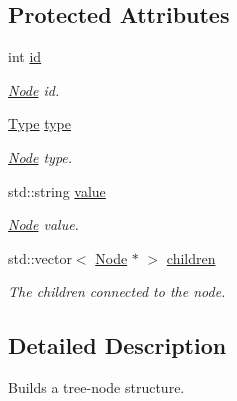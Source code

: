 \subsection*{Protected Attributes}
\begin{DoxyCompactItemize}
\item 
\hypertarget{classNode_a59a543130a10c95f1e8642cf8c5645e8}{}int \hyperlink{classNode_a59a543130a10c95f1e8642cf8c5645e8}{id}\label{classNode_a59a543130a10c95f1e8642cf8c5645e8}

\begin{DoxyCompactList}\small\item\em \hyperlink{classNode}{Node} id. \end{DoxyCompactList}\item 
\hypertarget{classNode_adcaf01927a597ad0e6025b173fe5e552}{}\hyperlink{classNode_a8dad370be1595f49e0a7c2406a91e867}{Type} \hyperlink{classNode_adcaf01927a597ad0e6025b173fe5e552}{type}\label{classNode_adcaf01927a597ad0e6025b173fe5e552}

\begin{DoxyCompactList}\small\item\em \hyperlink{classNode}{Node} type. \end{DoxyCompactList}\item 
\hypertarget{classNode_a51de8a12e67206f893b0bd6c2afeb11c}{}std\+::string \hyperlink{classNode_a51de8a12e67206f893b0bd6c2afeb11c}{value}\label{classNode_a51de8a12e67206f893b0bd6c2afeb11c}

\begin{DoxyCompactList}\small\item\em \hyperlink{classNode}{Node} value. \end{DoxyCompactList}\item 
\hypertarget{classNode_a49baf1d613dc14f1e1e4aad883dde6fe}{}std\+::vector$<$ \hyperlink{classNode}{Node} $\ast$ $>$ \hyperlink{classNode_a49baf1d613dc14f1e1e4aad883dde6fe}{children}\label{classNode_a49baf1d613dc14f1e1e4aad883dde6fe}

\begin{DoxyCompactList}\small\item\em The children connected to the node. \end{DoxyCompactList}\end{DoxyCompactItemize}


\subsection{Detailed Description}
Builds a tree-\/node structure. 

